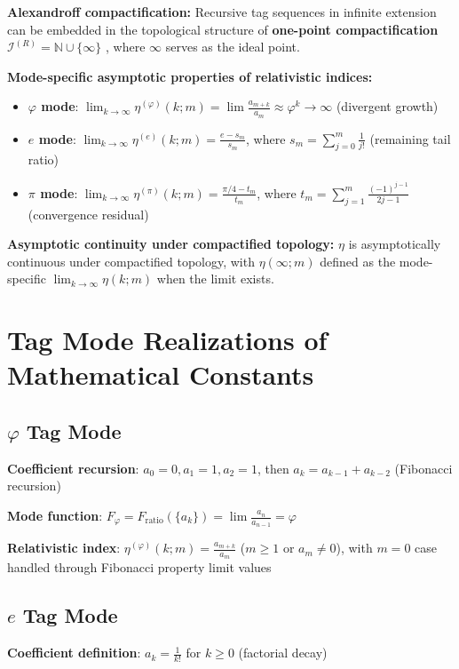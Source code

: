 \documentclass[12pt]{article}
\theoremstyle{plain}
\theoremstyle{definition}
\begin{document}
\textbf{Alexandroff compactification:} Recursive tag sequences in infinite extension can be embedded in the topological structure of \textbf{one-point compactification} $\mathcal{I}^{(R)} = \mathbb{N} \cup \{\infty\}$ \cite{alexandroff1924}, where $\infty$ serves as the ideal point.

\textbf{Mode-specific asymptotic properties of relativistic indices:}
\begin{itemize}
\item \textbf{$\varphi$ mode}: $\lim_{k \to \infty} \eta^{(\varphi)}(k; m) = \lim \frac{a_{m+k}}{a_m} \approx \varphi^k \to \infty$ (divergent growth)
\item \textbf{$e$ mode}: $\lim_{k \to \infty} \eta^{(e)}(k; m) = \frac{e - s_m}{s_m}$, where $s_m = \sum_{j=0}^m \frac{1}{j!}$ (remaining tail ratio)
\item \textbf{$\pi$ mode}: $\lim_{k \to \infty} \eta^{(\pi)}(k; m) = \frac{\pi/4 - t_m}{t_m}$, where $t_m = \sum_{j=1}^m \frac{(-1)^{j-1}}{2j-1}$ (convergence residual)
\end{itemize}

\textbf{Asymptotic continuity under compactified topology:} $\eta$ is asymptotically continuous under compactified topology, with $\eta(\infty; m)$ defined as the mode-specific $\lim_{k \to \infty} \eta(k; m)$ when the limit exists.

\section{Tag Mode Realizations of Mathematical Constants}

\subsection{$\varphi$ Tag Mode}
\textbf{Coefficient recursion}: $a_0 = 0, a_1 = 1, a_2 = 1$, then $a_k = a_{k-1} + a_{k-2}$ (Fibonacci recursion)

\textbf{Mode function}: $F_\varphi = F_{\text{ratio}}(\{a_k\}) = \lim \frac{a_n}{a_{n-1}} = \varphi$

\textbf{Relativistic index}: $\eta^{(\varphi)}(k; m) = \frac{a_{m+k}}{a_m}$ ($m \geq 1$ or $a_m \neq 0$), with $m=0$ case handled through Fibonacci property limit values

\subsection{$e$ Tag Mode}
\textbf{Coefficient definition}: $a_k = \frac{1}{k!}$ for $k \geq 0$ (factorial decay)
\end{document}
